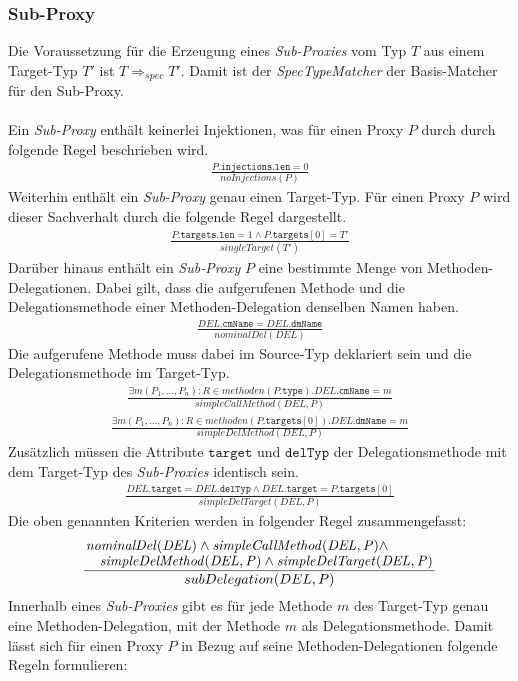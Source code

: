 \documentclass[a4paper,12pt]{article}
\begin{document}
\subsubsection{Sub-Proxy}

Die Voraussetzung für die Erzeugung eines \emph{Sub-Proxies} vom Typ $T$ aus einem Target-Typ $T'$ ist $T \Rightarrow_{spec} T'$. Damit ist der \emph{SpecTypeMatcher} der Basis-Matcher für den Sub-Proxy.\\\\
Ein \emph{Sub-Proxy} enthält keinerlei Injektionen, was für einen Proxy $P$ durch durch folgende Regel beschrieben wird.
\begin{gather*}
\frac{\mathit{P\texttt{.injections}}\texttt{.len} = 0}{\mathit{noInjections(P)}}
\end{gather*}
\noindent
Weiterhin enthält ein \emph{Sub-Proxy} genau einen Target-Typ. Für einen Proxy $P$ wird dieser Sachverhalt durch die folgende Regel dargestellt.
\begin{gather*}
\frac{P\texttt{.targets.len} = 1 \wedge P\texttt{.targets}[0] = T'}{\mathit{singleTarget(T')}}
\end{gather*}
Darüber hinaus enthält ein \emph{Sub-Proxy} $P$ eine bestimmte Menge von Methoden-Delegationen. Dabei gilt, dass die aufgerufenen Methode und die Delegationsmethode einer Methoden-Delegation denselben Namen haben.
\begin{gather*}
\frac{DEL\texttt{.cmName} = DEL\texttt{.dmName}}
{\mathit{nominalDel(DEL)}}
\end{gather*}
Die aufgerufene Methode muss dabei im Source-Typ deklariert sein und die Delegationsmethode im Target-Typ.
\begin{gather*}
\frac{\exists m(P_1,...,P_n):R \in \mathit{methoden(P\texttt{.type})}. DEL\texttt{.cmName} = m}
{\mathit{simpleCallMethod(DEL, P)}}
\end{gather*}
\begin{gather*}
\frac{\exists m(P_1,...,P_n):R \in \mathit{methoden(P\texttt{.targets}[0])}. DEL\texttt{.dmName} = m}
{\mathit{simpleDelMethod(DEL, P)}}
\end{gather*}
Zusätzlich müssen die Attribute $\texttt{target}$ und $\texttt{delTyp}$ der Delegationsmethode mit dem Target-Typ des \emph{Sub-Proxies} identisch sein.
\begin{gather*}
\frac{DEL\texttt{.target} = DEL\texttt{.delTyp} \wedge DEL\texttt{.target} = P\texttt{.targets}[0]}
{\mathit{simpleDelTarget(DEL, P)}}
\end{gather*}
Die oben genannten Kriterien werden in folgender Regel zusammengefasst:
\begin{gather*}
\frac{\splitfrac{\mathit{nominalDel(DEL)}\wedge\mathit{simpleCallMethod(DEL,P)\wedge}
}{\mathit{simpleDelMethod(DEL,P)\wedge\mathit{simpleDelTarget(DEL,P)}}}}
{subDelegation(DEL,P)}
\end{gather*}
Innerhalb eines \emph{Sub-Proxies} gibt es für jede Methode $m$ des Target-Typ genau eine Methoden-Delegation, mit der Methode $m$ als Delegationsmethode. Damit lässt sich für einen Proxy $P$ in Bezug auf seine Methoden-Delegationen folgende Regeln formulieren:
\end{document}
